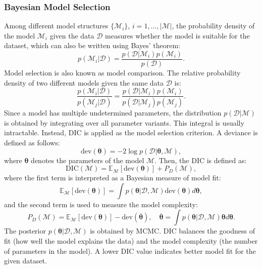 \subsubsection{Bayesian Model Selection}
Among different model structures $\{\mathcal{M}_i\}$, $i=1,\ldots,|\mathcal{M}|$, the probability density of the model $\mathcal{M}_i$ given the data $\mathcal{D}$ measures whether the model is suitable for the dataset, which can also be written using Bayes’ theorem:
\begin{equation}
    p(\mathcal{M}_i|\mathcal{D})=\frac{p(\mathcal{D}|\mathcal{M}_i)p(\mathcal{M}_i)}{p(\mathcal{D})}.
\end{equation}
Model selection is also known as model comparison. The relative probability density of two different models given the same data $\mathcal{D}$ is:
\begin{equation}
    \frac{p(\mathcal{M}_i|\mathcal{D})}{p(\mathcal{M}_j|\mathcal{D})} = \frac{p(\mathcal{D}|\mathcal{M}_i)p(\mathcal{M}_i)}{p(\mathcal{D}|\mathcal{M}_j)p(\mathcal{M}_j)}.
\end{equation}
Since a model has multiple undetermined parameters, the distribution $p(\mathcal{D}|\mathcal{M})$ is obtained by integrating over all parameter variants. This integral is usually intractable. Instead, \ac{DIC} \citep{Spiegelhalter2002,Spiegelhalter2014, li2025DIC} is applied as the model selection criterion. A deviance is defined as follows:
\begin{equation}
    \text{dev}(\boldsymbol{\theta}) = -2\log p(\mathcal{D}|\boldsymbol{\theta}, \mathcal{M}),
\end{equation}
where $\boldsymbol{\theta}$ denotes the parameters of the model $\mathcal{M}$. Then, the \ac{DIC} is defined as:
\begin{equation}
    \text{DIC}(\mathcal{M}) = \mathbb{E}_{\mathcal{M}}[\text{dev}(\boldsymbol{\theta})] + P_D(\mathcal{M}),
\end{equation}
where the first term is interpreted as a Bayesian measure of model fit:
    \begin{equation}
        \mathbb{E}_{\mathcal{M}}[\text{dev}(\boldsymbol{\theta})] = \int p(\boldsymbol{\theta}|\mathcal{D}, \mathcal{M})\text{dev}(\boldsymbol{\theta})d\boldsymbol{\theta},
    \end{equation}
and the second term is used to measure the model complexity:
    \begin{equation}
        P_D(\mathcal{M}) = \mathbb{E}_{\mathcal{M}}[\text{dev}(\boldsymbol{\theta})] - \text{dev}(\overline{\boldsymbol{\theta}}),\quad \overline{\boldsymbol{\theta}}=\int p(\boldsymbol{\theta}|\mathcal{D},\mathcal{M})\boldsymbol{\theta}d\boldsymbol{\theta}.
    \end{equation}
The posterior $p(\boldsymbol{\theta}|\mathcal{D},\mathcal{M})$ is obtained by \ac{MCMC}.
\ac{DIC} balances the goodness of fit (how well the model explains the data) and the model complexity (the number of parameters in the model). A lower \ac{DIC} value indicates better model fit for the given dataset. 

